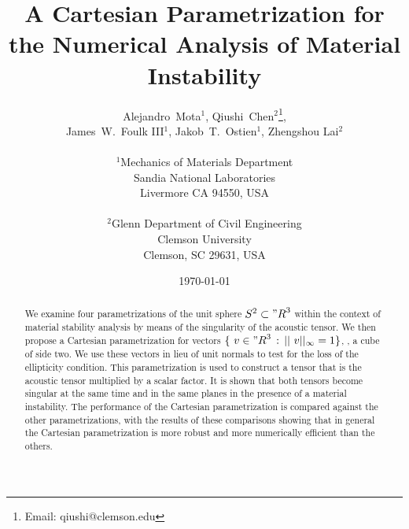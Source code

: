 \documentclass[12pt]{article}
\numberwithin{equation}{section}
\begin{document}





\title{A Cartesian Parametrization for the Numerical Analysis of
  Material Instability}

\author{
  \Large Alejandro~Mota$^1$,
  Qiushi~Chen$^2$\thanks{Email: qiushi@clemson.edu},
  \\
  \Large James~W.~Foulk {III}$^1$,
  Jakob~T.~Ostien$^1$, Zhengshou Lai$^2$
  \\
  \\
  $^1$Mechanics of Materials Department\\
  Sandia National Laboratories\\
  Livermore CA 94550, USA\\
  \\
  $^2$Glenn Department of Civil Engineering\\
  Clemson University\\
  Clemson, SC 29631, USA\\
}

\date{\today}

\maketitle

\begin{abstract}
  We examine four parametrizations of the unit sphere $S^2 \subset
  {"R}^3$ within the context of material stability analysis by means
  of the singularity of the acoustic tensor. We then propose a
  Cartesian parametrization for vectors $\{~v \in {"R}^3 \, : \,
  ||~v||_{\infty} = 1\}$, \ie, a cube of side two. We use these
  vectors in lieu of unit normals to test for the loss of the
  ellipticity condition. This parametrization is used to construct a
  tensor that is the acoustic tensor multiplied by a scalar factor. It
  is shown that both tensors become singular at the same time and in
  the same planes in the presence of a material instability. The
  performance of the Cartesian parametrization is compared against the
  other parametrizations, with the results of these comparisons
  showing that in general the Cartesian parametrization is more robust
  and more numerically efficient than the others.
\end{abstract}
\end{document}
